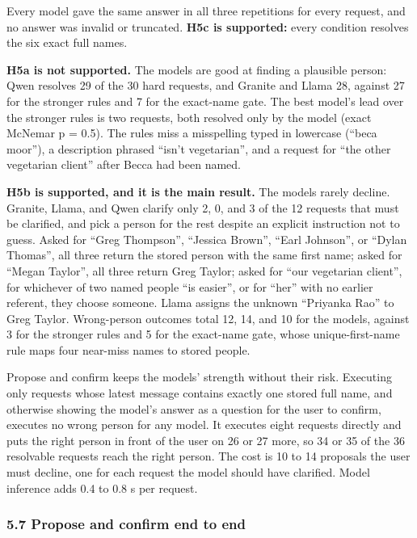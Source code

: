 \documentclass[
  10pt,
  letterpaper,
]{article}
\begin{document}
Every model gave the same answer in all three repetitions for every
request, and no answer was invalid or truncated. \textbf{H5c is
supported:} every condition resolves the six exact full names.

\textbf{H5a is not supported.} The models are good at finding a
plausible person: Qwen resolves 29 of the 30 hard requests, and Granite
and Llama 28, against 27 for the stronger rules and 7 for the exact-name
gate. The best model's lead over the stronger rules is two requests,
both resolved only by the model (exact McNemar p = 0.5). The rules miss
a misspelling typed in lowercase (``beca moor''), a description phrased
``isn't vegetarian'', and a request for ``the other vegetarian client''
after Becca had been named.

\textbf{H5b is supported, and it is the main result.} The models rarely
decline. Granite, Llama, and Qwen clarify only 2, 0, and 3 of the 12
requests that must be clarified, and pick a person for the rest despite
an explicit instruction not to guess. Asked for ``Greg Thompson'',
``Jessica Brown'', ``Earl Johnson'', or ``Dylan Thomas'', all three
return the stored person with the same first name; asked for ``Megan
Taylor'', all three return Greg Taylor; asked for ``our vegetarian
client'', for whichever of two named people ``is easier'', or for
``her'' with no earlier referent, they choose someone. Llama assigns the
unknown ``Priyanka Rao'' to Greg Taylor. Wrong-person outcomes total 12,
14, and 10 for the models, against 3 for the stronger rules and 5 for
the exact-name gate, whose unique-first-name rule maps four near-miss
names to stored people.

Propose and confirm keeps the models' strength without their risk.
Executing only requests whose latest message contains exactly one stored
full name, and otherwise showing the model's answer as a question for
the user to confirm, executes no wrong person for any model. It executes
eight requests directly and puts the right person in front of the user
on 26 or 27 more, so 34 or 35 of the 36 resolvable requests reach the
right person. The cost is 10 to 14 proposals the user must decline, one
for each request the model should have clarified. Model inference adds
0.4 to 0.8 s per request.

\subsubsection{5.7 Propose and confirm end to
end}\label{propose-and-confirm-end-to-end}
\end{document}
